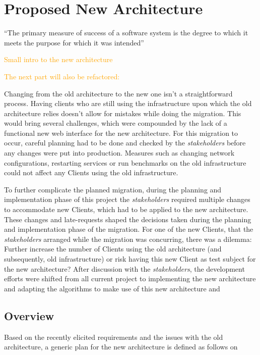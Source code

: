 \section{Proposed New Architecture}\label{methodology:s:proposed-new-architecture}

``The primary measure of success of a software system is the
degree to which it meets the purpose for which it was
intended''

\textcolor{orange}{Small intro to the new architecture}

\textcolor{orange}{The next part will also be refactored:}

Changing from the old architecture to the new one isn't a straightforward process. Having clients who are still using the infrastructure upon which the old architecture relies doesn't allow for mistakes while doing the migration. This would bring several challenges, which were compounded by the lack of a functional new web interface for the new architecture. For this migration to occur, careful planning had to be done and checked by the \textit{stakeholders} before any changes were put into production. Measures such as changing network configurations, restarting services or run benchmarks on the old infrastructure could not affect any Clients using the old infrastructure.

To further complicate the planned migration, during the planning and implementation phase of this project the \textit{stakeholders} required multiple changes to accommodate new Clients, which had to be applied to the new architecture. These changes and late-requests shaped the decisions taken during the planning and implementation phase of the migration. For one of the new Clients, that the \textit{stakeholders} arranged while the migration was concurring, there was a dilemma: Further increase the number of Clients using the old architecture (and subsequently, old infrastructure) or risk having this new Client as test subject for the new architecture? After discussion with the \textit{stakeholders}, the development efforts were shifted from all current project to implementing the new architecture and adapting the algorithms to make use of this new architecture and 


\subsection{Overview}\label{methodology:ss:overview-new-arch}
Based on the recently elicited requirements and the issues with the old architecture, a generic plan for the new architecture is defined as follows on 

